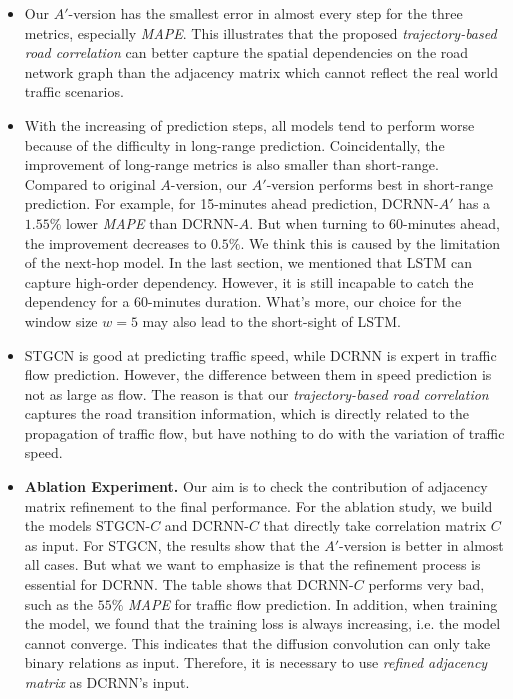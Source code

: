 \begin{table}[htb]
\begin{center}
{\begin{tabular}{c|c|ccc|ccc|ccc}
                \bottomrule
            \end{tabular}
        }
    \end{center}
\end{table}

\begin{itemize}
    \item Our $A'$-version has the smallest error in almost every step for the three metrics, especially \textit{MAPE}. This illustrates that the proposed \textit{trajectory-based road correlation} can better capture the spatial dependencies on the road network graph than the adjacency matrix which cannot reflect the real world traffic scenarios.
    \item With the increasing of prediction steps, all models tend to perform worse because of the difficulty in long-range prediction. Coincidentally, the improvement of long-range metrics is also smaller than short-range. Compared to original $A$-version, our $A'$-version performs best in short-range prediction. For example, for 15-minutes ahead prediction, DCRNN-$A'$ has a $1.55\%$ lower \textit{MAPE} than DCRNN-$A$. But when turning to 60-minutes ahead, the improvement decreases to $0.5\%$. We think this is caused by the limitation of the next-hop model. In the last section, we mentioned that LSTM can capture high-order dependency. However, it is still incapable to catch the dependency for a 60-minutes duration. What's more, our choice for the window size $w=5$ may also lead to the short-sight of LSTM.
    \item STGCN is good at predicting traffic speed, while DCRNN is expert in traffic flow prediction. However, the difference between them in speed prediction is not as large as flow. The reason is that our \textit{trajectory-based road correlation} captures the road transition information, which is directly related to the propagation of traffic flow, but have nothing to do with the variation of traffic speed.
    \item \textbf{Ablation Experiment.} Our aim is to check the contribution of adjacency matrix refinement to the final performance. For the ablation study, we build the models STGCN-$C$ and DCRNN-$C$ that directly take correlation matrix $C$ as input. For STGCN, the results show that the $A'$-version is better in almost all cases. But what we want to emphasize is that the refinement process is essential for DCRNN. The table shows that DCRNN-$C$ performs very bad, such as the $55\%$ \textit{MAPE} for traffic flow prediction. In addition, when training the model, we found that the training loss is always increasing, i.e. the model cannot converge. This indicates that the diffusion convolution can only take binary relations as input. Therefore, it is necessary to use \textit{refined adjacency matrix} as DCRNN's input.
\end{itemize}


